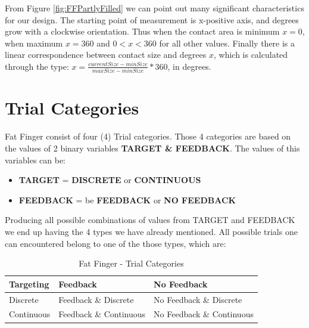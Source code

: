 From Figure \ref{fig:FFPartlyFilled} we can point out many significant characteristics for our design. The starting point of measurement is x-positive axis, and degrees grow with a clockwise orientation. Thus when the contact area is minimum $x=0$, when maximum $x=360$ and $0<x<360$ for all other values. Finally there is a linear correspondence between contact size and degrees $x$, which is calculated through the type: $x = \frac{currentSize - minSize}{maxSize - minSize} * 360$, in degrees.













\section{Trial Categories}

Fat Finger consist of four (4) Trial categories. Those 4 categories are based on the values of 2 binary variables \textbf{TARGET \& FEEDBACK}. The values of this variables can be:
\begin{itemize}
	\item \textbf{TARGET} = \textbf{DISCRETE} or \textbf{CONTINUOUS}
	\item \textbf{FEEDBACK} = be \textbf{FEEDBACK} or \textbf{NO FEEDBACK}
\end{itemize}

Producing all possible combinations of values from TARGET and FEEDBACK we end up having the 4 types we have already mentioned. All possible trials one can encountered belong to one of the those types, which are:


\begin{table}[H]
\centering
\begin{tabular}{l || l | l}
Targeting & Feedback & No Feedback \\
\hline \hline
Discrete & Feedback \& Discrete &  No Feedback \& Discrete\\
Continuous & Feedback \& Continuous & No Feedback \& Continuous
\end{tabular}
\caption{Fat Finger - Trial Categories}
\label{tab:ffTrialCateg}
\end{table}

